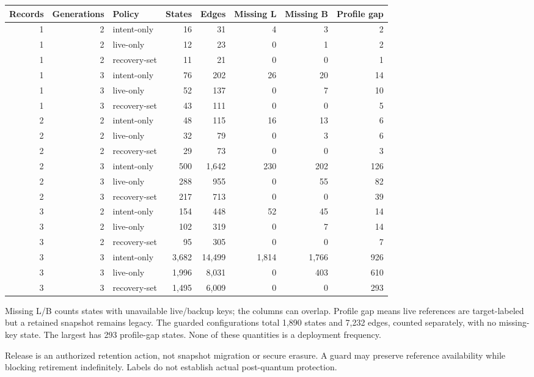 \documentclass[10pt]{article}
\begin{document}
\begin{center}\small
\begin{tabular}{@{}rrlrrrrr@{}}
\toprule
Records & Generations & Policy & States & Edges & Missing L & Missing B & Profile gap\\
\midrule
1 & 2 & intent-only & 16 & 31 & 4 & 3 & 2 \\
1 & 2 & live-only & 12 & 23 & 0 & 1 & 2 \\
1 & 2 & recovery-set & 11 & 21 & 0 & 0 & 1 \\
1 & 3 & intent-only & 76 & 202 & 26 & 20 & 14 \\
1 & 3 & live-only & 52 & 137 & 0 & 7 & 10 \\
1 & 3 & recovery-set & 43 & 111 & 0 & 0 & 5 \\
2 & 2 & intent-only & 48 & 115 & 16 & 13 & 6 \\
2 & 2 & live-only & 32 & 79 & 0 & 3 & 6 \\
2 & 2 & recovery-set & 29 & 73 & 0 & 0 & 3 \\
2 & 3 & intent-only & 500 & 1,642 & 230 & 202 & 126 \\
2 & 3 & live-only & 288 & 955 & 0 & 55 & 82 \\
2 & 3 & recovery-set & 217 & 713 & 0 & 0 & 39 \\
3 & 2 & intent-only & 154 & 448 & 52 & 45 & 14 \\
3 & 2 & live-only & 102 & 319 & 0 & 7 & 14 \\
3 & 2 & recovery-set & 95 & 305 & 0 & 0 & 7 \\
3 & 3 & intent-only & 3,682 & 14,499 & 1,814 & 1,766 & 926 \\
3 & 3 & live-only & 1,996 & 8,031 & 0 & 403 & 610 \\
3 & 3 & recovery-set & 1,495 & 6,009 & 0 & 0 & 293 \\
\bottomrule\end{tabular}\end{center}
Missing L/B counts states with unavailable live/backup keys; the columns can
overlap. Profile gap means live references are target-labeled but a retained
snapshot remains legacy. The guarded configurations total 1,890 states and
7,232 edges, counted separately, with no missing-key state. The largest has
293 profile-gap states. None of these quantities is a deployment frequency.

Release is an authorized retention action, not snapshot migration or secure
erasure. A guard may preserve reference availability while blocking retirement
indefinitely. Labels do not establish actual post-quantum protection.
\end{document}
